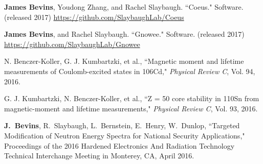 \begin{bibsection}
\item \textbf{James Bevins}, Youdong Zhang, and Rachel Slaybaugh. ``Coeus." Software. (released 2017) \url{https://github.com/SlaybaughLab/Coeus} 

\item \textbf{James Bevins}, and Rachel Slaybaugh. ``Gnowee." Software. (released 2017) \url{https://github.com/SlaybaughLab/Gnowee}


\item N. Benczer-Koller, G. J. Kumbartzki, et al., ``Magnetic moment and lifetime measurements of Coulomb-excited states in 106Cd," \textit{Physical Review C}, Vol. 94, 2016.
  
\item G. J. Kumbartzki, N. Benczer-Koller, et al., ``Z = 50 core stability in 110Sn from magnetic-moment and lifetime measurements," \textit{Physical Review C}, Vol. 93, 2016.


\item \textbf{J.\ Bevins}, R.\ Slaybaugh, L.\ Bernstein, E.\ Henry, W.\ Dunlop, ``Targeted Modification of Neutron Energy Spectra for National Security Applications," Proceedings of the 2016 Hardened Electronics And Radiation Technology Technical Interchange Meeting in Monterey, CA, April 2016. 

  
  

\end{bibsection}
